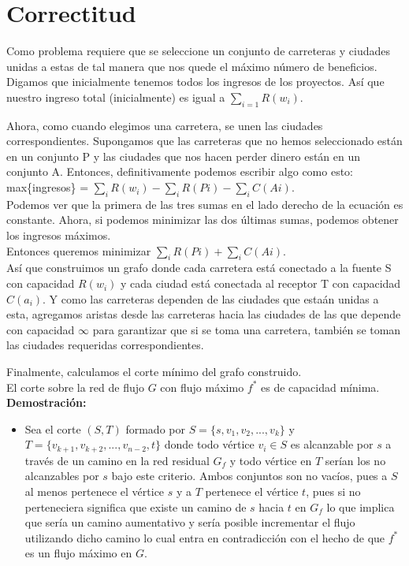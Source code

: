 \documentclass[runningheads,a4paper]{llncs}
\begin{document}
{\section{Correctitud}

Como problema requiere que se seleccione un conjunto de carreteras y ciudades unidas a estas de tal manera que nos quede el máximo número de beneficios.
Digamos que inicialmente tenemos todos los ingresos de los proyectos. Así que nuestro ingreso total (inicialmente) es igual a $\sum_{i=1}R(w_i)$.

Ahora, como cuando elegimos una carretera, se unen las ciudades correspondientes. Supongamos que las carreteras que no hemos seleccionado están en un conjunto P y las ciudades que nos hacen perder dinero están en un conjunto A. Entonces, definitivamente podemos escribir algo como esto:\\
max\{ingresos\} = $\sum_iR(w_i)-\sum_iR(Pi)-\sum_iC(Ai)$.\\

Podemos ver que la primera de las tres sumas en el lado derecho de la ecuaci\'on es constante. Ahora, si podemos minimizar las dos \'ultimas sumas, podemos obtener los ingresos m\'aximos.\\

Entonces queremos minimizar $\sum_iR(Pi)+\sum_iC(Ai)$.\\ 

As\'i que construimos un grafo donde cada carretera est\'a conectado a la fuente S con capacidad $R(w_i)$ y cada ciudad est\'a conectada al receptor T con capacidad $C(a_i)$. Y como las carreteras dependen de las ciudades que esta\'an unidas a esta, agregamos aristas desde las carreteras hacia las ciudades de las que depende con capacidad $\infty$ para garantizar que si se toma una carretera, también se toman las ciudades requeridas correspondientes.

Finalmente, calculamos el corte m\'inimo del grafo construido.\\

El corte sobre la red de flujo $G$ con flujo m\'aximo $f^*$ es de capacidad m\'inima.
	\textbf{Demostraci\'on:}
	\begin{itemize} 
		\item[]  Sea el corte $(S,T)$ formado por $S = \{s,v_1,v_2,...,v_k\} $ y $T = \{v_{k+1},v_{k+2},...,v_{n-2},t\} $ donde todo v\'ertice $v_i \in S$ es alcanzable por $s$ a trav\'es de un camino en la red residual $G_f$ y todo v\'ertice en $T$ ser\'ian los no alcanzables por $s$ bajo este criterio. Ambos conjuntos son no vac\'ios, pues a $S$ al menos pertenece el v\'ertice $s$ y a $T$ pertenece el v\'ertice $t$, pues si no perteneciera significa que existe un camino de $s$ hacia $t$ en $G_f$ lo que implica que ser\'ia un camino aumentativo y ser\'ia posible incrementar el flujo utilizando dicho camino lo cual entra en contradicci\'on con el hecho de que $f^*$ es un flujo m\'aximo en $G$.
		

\end{itemize}}
\end{document}
